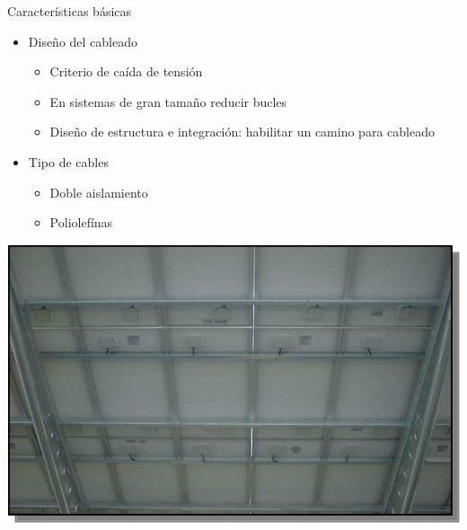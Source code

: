 \documentclass[xcolor={usenames,svgnames,dvipsnames}]{beamer}
\begin{document}
\begin{frame}[label=sec-3-0-1]{Características básicas}
\begin{itemize}
\item Diseño del cableado

\begin{itemize}
\item Criterio de caída de tensión

\item En sistemas de gran tamaño reducir bucles

\item Diseño de estructura e integración: habilitar un camino para
cableado
\end{itemize}

\item Tipo de cables

\begin{itemize}
\item Doble aislamiento

\item Poliolefínas
\end{itemize}
\end{itemize}
\includegraphics[height=0.5\textheight]{../figs/PhotocampaCableado.jpg}
\end{frame}
\end{document}
